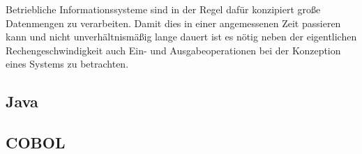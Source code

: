 Betriebliche Informationssysteme sind in der Regel dafür konzipiert große Datenmengen zu verarbeiten. Damit dies in einer angemessenen Zeit passieren kann und nicht unverhältnismäßig lange dauert ist es nötig neben der eigentlichen Rechengeschwindigkeit auch Ein- und Ausgabeoperationen bei der Konzeption eines Systems zu betrachten.

\subsection*{Java}

\subsection*{COBOL}
